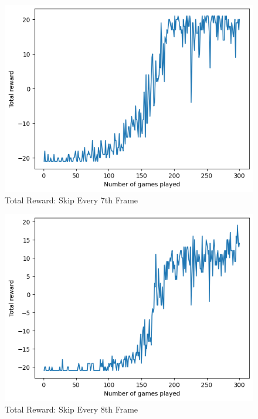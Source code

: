 \documentclass[12pt, a4paper, twocolumn]{article} %
\begin{document}
\begin{figure}[H]
	\includegraphics[width=\linewidth]{tr_sk7.PNG} %
	\caption{Total Reward: Skip Every 7th Frame} %
\end{figure}

\begin{figure}[H]
	\includegraphics[width=\linewidth]{tr_sk8.PNG} %
	\caption{Total Reward: Skip Every 8th Frame} %
\end{figure}
\end{document}
